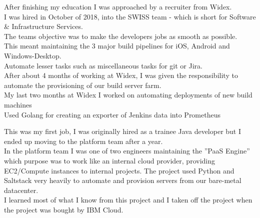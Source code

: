 \documentclass[]{cv}
\begin{document}
\begin{minipage}[t]{0.66\textwidth}

After finishing my education I was approached by a recruiter from Widex. \\
I was hired in October of 2018, into the SWISS team - which is short for Software \& Infrastructure Services. \\
The teams objective was to make the developers jobs as smooth as possible. \\
This meant maintaining the 3 major build pipelines for iOS, Android and Windows-Desktop. \\
Automate lesser tasks such as miscellaneous tasks for git or Jira. \\
After about 4 months of working at Widex, I was given the responsibility to automate the provisioning of our build server farm. \\
My last two months at Widex I worked on automating deployments of new build machines \\
Used Golang for creating an exporter of Jenkins data into Prometheus
\sectionsep


This was my first job, I was originally hired as a trainee Java developer but I ended up moving
to the platform team after a year. \\
In the platform team I was one of two engineers maintaining the ”PaaS Engine” which
purpose was to work like an internal cloud provider, providing EC2/Compute instances to
internal projects. The project used Python and Saltstack very heavily to automate and
provision servers from our bare-metal datacenter. \\
I learned most of what I know from this project and I taken off the project when the project
was bought by IBM Cloud.
\sectionsep

\end{minipage} 
\end{document}
